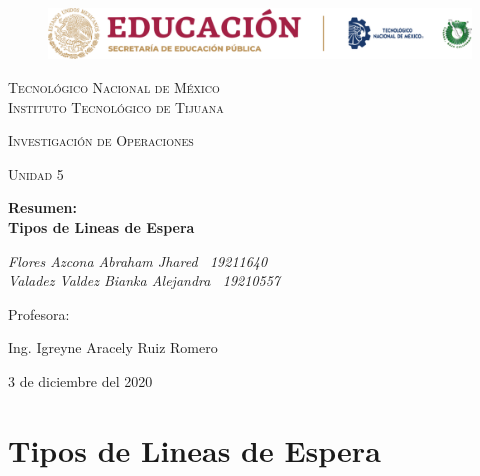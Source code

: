 \documentclass[letterpaper, 12pt]{article}
\begin{document}
    
    \begin{titlepage}
        \begin{figure}[ht]
            \centering
            \includegraphics[width=15cm]{logosITT.png}
        \end{figure}
        \centering
        {\scshape\LARGE Tecnológico Nacional de México\\Instituto Tecnológico de Tijuana\par}
        \vspace{1cm}
        {\scshape\Large Investigación de Operaciones\par}
        \vspace{1cm}
        {\scshape\Large Unidad 5\par}
        \vspace{1.5cm}
        {\huge\bfseries Resumen:\\Tipos de Lineas de Espera\par}
        \vspace{2cm}
        {\Large\itshape Flores Azcona Abraham Jhared \, 19211640\\ Valadez Valdez Bianka Alejandra \, 19210557\par}
        \vfill
        Profesora: \par
        Ing. Igreyne Aracely Ruiz Romero
        
        \vfill

        {\large 3 de diciembre del 2020}
    \end{titlepage}

    \newpage
    \section*{Tipos de Lineas de Espera}
\end{document}
